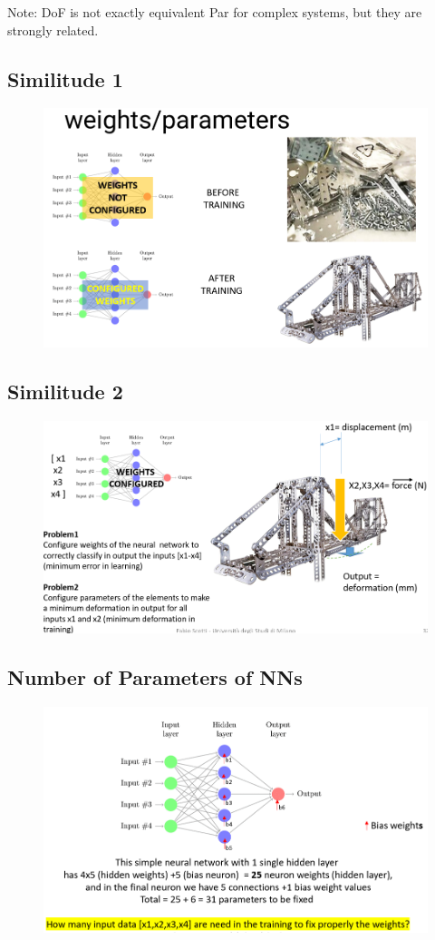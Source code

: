 \noindent Note: DoF is not exactly equivalent Par for complex systems, but they are strongly related.

\subsection{Similitude 1}
\begin{figure}[H]
    \centering
    \includegraphics[width=0.8\linewidth]{07-08/images/similitude 1.png}
\end{figure}

\subsection{Similitude 2}
\begin{figure}[H]
    \centering
    \includegraphics[width=0.8\linewidth]{07-08/images/similitude 2.png}
\end{figure}

\subsection{Number of Parameters of NNs}
\begin{figure}[H]
    \centering
    \includegraphics[width=0.8\linewidth]{07-08/images/nns.png}
\end{figure}

